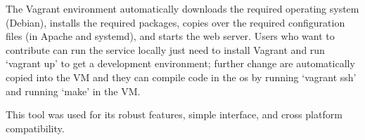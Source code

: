 The Vagrant environment automatically downloads the required operating system (Debian), installs the required packages, copies over the required configuration files (in Apache and systemd), and starts the web server.
Users who want to contribute can run the service locally just need to install Vagrant and run `vagrant up' to get a development environment; further change are automatically copied into the VM and they can compile code in the os by running `vagrant ssh' and running `make' in the VM.

This tool was used for its robust features, simple interface, and cross platform compatibility.
